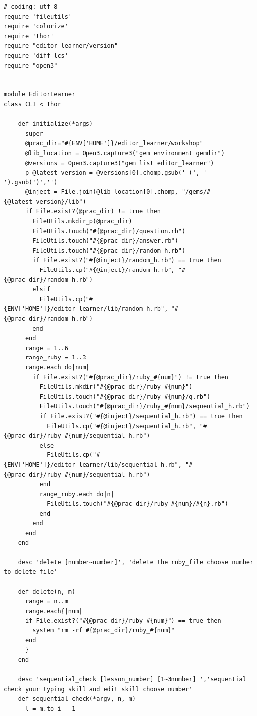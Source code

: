 \documentclass[11pt,dvipdfmx]{jsarticle}
\begin{document}
\begin{verbatim}
# coding: utf-8
require 'fileutils'
require 'colorize'
require 'thor'
require "editor_learner/version"
require 'diff-lcs'
require "open3"


module EditorLearner
class CLI < Thor

    def initialize(*args)
      super
      @prac_dir="#{ENV['HOME']}/editor_learner/workshop"
      @lib_location = Open3.capture3("gem environment gemdir")
      @versions = Open3.capture3("gem list editor_learner")
      p @latest_version = @versions[0].chomp.gsub(' (', '-').gsub(')','')
      @inject = File.join(@lib_location[0].chomp, "/gems/#{@latest_version}/lib")
      if File.exist?(@prac_dir) != true then
        FileUtils.mkdir_p(@prac_dir)
        FileUtils.touch("#{@prac_dir}/question.rb")
        FileUtils.touch("#{@prac_dir}/answer.rb")
        FileUtils.touch("#{@prac_dir}/random_h.rb")
        if File.exist?("#{@inject}/random_h.rb") == true then
          FileUtils.cp("#{@inject}/random_h.rb", "#{@prac_dir}/random_h.rb")
        elsif  
          FileUtils.cp("#{ENV['HOME']}/editor_learner/lib/random_h.rb", "#{@prac_dir}/random_h.rb")
        end
      end
      range = 1..6
      range_ruby = 1..3
      range.each do|num|
        if File.exist?("#{@prac_dir}/ruby_#{num}") != true then
          FileUtils.mkdir("#{@prac_dir}/ruby_#{num}")
          FileUtils.touch("#{@prac_dir}/ruby_#{num}/q.rb")
          FileUtils.touch("#{@prac_dir}/ruby_#{num}/sequential_h.rb")
          if File.exist?("#{@inject}/sequential_h.rb") == true then
            FileUtils.cp("#{@inject}/sequential_h.rb", "#{@prac_dir}/ruby_#{num}/sequential_h.rb")
          else
            FileUtils.cp("#{ENV['HOME']}/editor_learner/lib/sequential_h.rb", "#{@prac_dir}/ruby_#{num}/sequential_h.rb")
          end
          range_ruby.each do|n|
            FileUtils.touch("#{@prac_dir}/ruby_#{num}/#{n}.rb")
          end
        end
      end
    end
    
    desc 'delete [number~number]', 'delete the ruby_file choose number to delete file'
    
    def delete(n, m)
      range = n..m
      range.each{|num|
      if File.exist?("#{@prac_dir}/ruby_#{num}") == true then
        system "rm -rf #{@prac_dir}/ruby_#{num}"
      end
      }
    end

    desc 'sequential_check [lesson_number] [1~3number] ','sequential check your typing skill and edit skill choose number'
    def sequential_check(*argv, n, m)
      l = m.to_i - 1
     

\end{verbatim}
\end{document}
